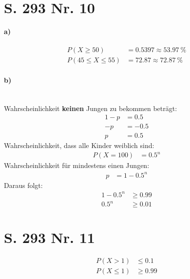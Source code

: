 \documentclass[12pt,a4paper]{report}
\begin{document}
	\section{S. 293 Nr. 10}
	\paragraph{a)}
	\begin{align*}
		P(X \geq 50) &= 0.5397 \approx 53.97\ \% \\
		P(45 \leq X \leq 55) &= 72.87 \approx 72.87\ \%
	\end{align*}
	\paragraph{b)} \mbox{} \\
	Wahrscheinlichkeit \textbf{keinen} Jungen zu bekommen beträgt: 
	\begin{align*}
		1-p &= 0.5 \\
		-p &= -0.5 \\
		p &= 0.5
	\end{align*}
	Wahrscheinlichkeit, dass alle Kinder weiblich sind:
	\begin{align*}
		P(X = 100) &= 0.5^{n}
	\end{align*}
	Wahrscheinlichkeit für mindestens einen Jungen:
	\begin{align*}
		p &= 1-0.5^{n}
	\end{align*}
	Daraus folgt:
	\begin{align*}
		1-0.5^{n} &\geq 0.99 \\
		0.5^{n} &\geq 0.01
	\end{align*}
	
	\section{S. 293 Nr. 11}
	\begin{align*}
		P(X > 1) &\leq 0.1 \\
		P(X \leq 1) &\geq 0.99 
	\end{align*}
\end{document}
